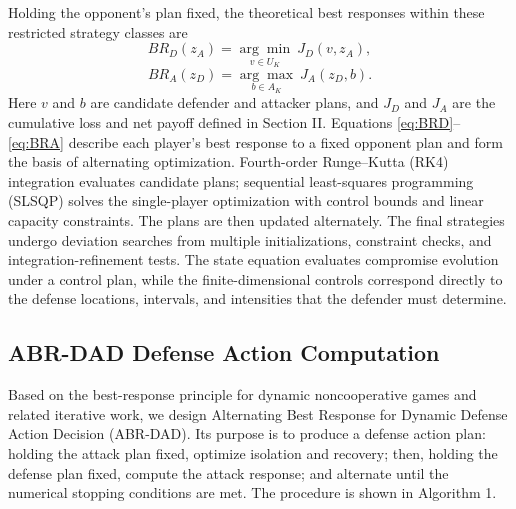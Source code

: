 \documentclass[conference,letterpaper]{IEEEtran}
\begin{document}
Holding the opponent's plan fixed, the theoretical best responses within these restricted strategy classes are
\begin{equation}\label{eq:BRD}
BR_D(z_A)=\underset{v\in U_K}{\arg\min}\ J_D(v,z_A),
\end{equation}
\begin{equation}\label{eq:BRA}
BR_A(z_D)=\underset{b\in A_K}{\arg\max}\ J_A(z_D,b).
\end{equation}
Here $v$ and $b$ are candidate defender and attacker plans, and $J_D$ and $J_A$ are the cumulative loss and net payoff defined in Section II. Equations \eqref{eq:BRD}--\eqref{eq:BRA} describe each player's best response to a fixed opponent plan and form the basis of alternating optimization. Fourth-order Runge--Kutta (RK4) integration\cite{r19} evaluates candidate plans; sequential least-squares programming (SLSQP) solves the single-player optimization with control bounds and linear capacity constraints\cite{r20,r21}. The plans are then updated alternately. The final strategies undergo deviation searches from multiple initializations, constraint checks, and integration-refinement tests. The state equation evaluates compromise evolution under a control plan, while the finite-dimensional controls correspond directly to the defense locations, intervals, and intensities that the defender must determine.

\subsection{ABR-DAD Defense Action Computation}
Based on the best-response principle for dynamic noncooperative games\cite{r17} and related iterative work\cite{r22}, we design Alternating Best Response for Dynamic Defense Action Decision (ABR-DAD). Its purpose is to produce a defense action plan: holding the attack plan fixed, optimize isolation and recovery; then, holding the defense plan fixed, compute the attack response; and alternate until the numerical stopping conditions are met. The procedure is shown in Algorithm 1.
\end{document}
